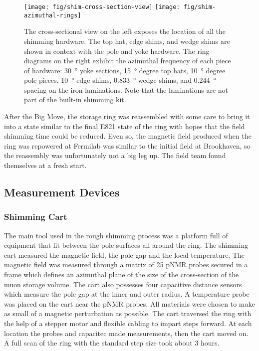 \begin{figure}
\label{fig:shim-cross-section-view}
\centering
\texttt{[image: fig/shim-cross-section-view]}
\texttt{[image: fig/shim-azimuthal-rings]}
\caption{The cross-sectional view on the left exposes the location of all the shimming hardware.  The top hat, edge shims, and wedge shims are shown in context with the pole and yoke hardware.  The ring diagrams on the right exhibit the azimuthal frequency of each piece of hardware: \SI{30}{\degree} yoke sections, \SI{15}{\degree} degree top hats, \SI{10}{\degree} degree pole pieces, \SI{10}{\degree} edge shims, \SI{0.833}{\degree} wedge shims, and \SI{0.244}{\degree} spacing on the iron laminations.  Note that the laminations are not part of the built-in shimming kit.}
\end{figure}

After the Big Move, the storage ring was reassembled with some care to bring it into a state similar to the final E821 state of the ring with hopes that the field shimming time could be reduced.  Even so, the magnetic field produced when the ring was repowered at Fermilab was similar to the initial field at Brookhaven, so the reassembly was unfortunately not a big leg up.  The field team found themselves at a fresh start.

\subsection{Measurement Devices}

\subsubsection{Shimming Cart}
The main tool used in the rough shimming process was a platform full of equipment that fit between the pole surfaces all around the ring.  The shimming cart measured the magnetic field, the pole gap and the local temperature.  The magnetic field was measured through a matrix of 25 pNMR probes secured in a frame which defines an azimuthal plane of the size of the cross-section of the muon storage volume. The cart also possesses four capacitive distance sensors which measure the pole gap at the inner and outer radius.  A temperature probe was placed on the cart near the pNMR probes.  All materials were chosen to make as small of a magnetic perturbation as possible.  The cart traversed the ring with the help of a stepper motor and flexible cabling to impart steps forward.  At each location the probes and capacitec made measurements, then the cart moved on.  A full scan of the ring with the standard step size took about 3 hours.

